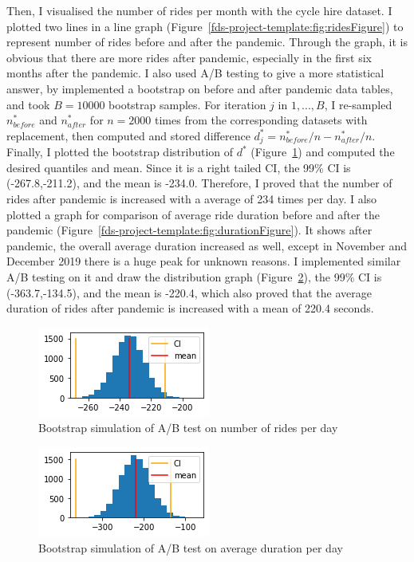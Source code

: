 \documentclass[11pt,a4paper]{article}
\begin{document}
Then, I visualised the number of rides per month with the cycle hire dataset. I plotted two lines in a line graph (Figure~\ref{fds-project-template:fig:ridesFigure}) to represent number of rides before and after the pandemic. Through the graph, it is obvious that there are more rides after pandemic, especially in the first six months after the pandemic. I also used A/B testing to give a more statistical answer, by implemented a bootstrap on before and after pandemic data tables, and took $B=10000$ bootstrap samples. For iteration $j$ in $1,...,B$, I re-sampled $n_{before}^*$ and $n_{after}^*$ for $n = 2000$ times from the corresponding datasets with replacement, then computed and stored difference $d_j^* = n_{before}^*/n - n_{after}^*/n$. Finally, I plotted the bootstrap distribution of $d^*$ (Figure~\ref{fds-project-template:fig:ab1}) and computed the desired quantiles and mean. Since it is a right tailed CI, the 99\% CI is (-267.8,-211.2), and the mean is -234.0. Therefore, I proved that the number of rides after pandemic is increased with a average of 234 times per day. I also plotted a graph for comparison of average ride duration before and after the pandemic (Figure~\ref{fds-project-template:fig:durationFigure}). It shows after pandemic, the overall average duration increased as well, except in November and December 2019 there is a huge peak for unknown reasons. I implemented similar A/B testing on it and draw the distribution graph (Figure~\ref{fds-project-template:fig:ab2}), the 99\% CI is (-363.7,-134.5), and the mean is -220.4, which also proved that the average duration of rides after pandemic is increased with a mean of 220.4 seconds.

\begin{figure}[ht!]
  \centering
  \includegraphics{report/ab1.png}
  \caption{Bootstrap simulation of A/B test on number of rides per day}
  \label{fds-project-template:fig:ab1}
\end{figure}

\begin{figure}[ht!]
  \centering
  \includegraphics{report/ab2.png}
  \caption{Bootstrap simulation of A/B test on average duration per day}
  \label{fds-project-template:fig:ab2}
\end{figure}
\end{document}
